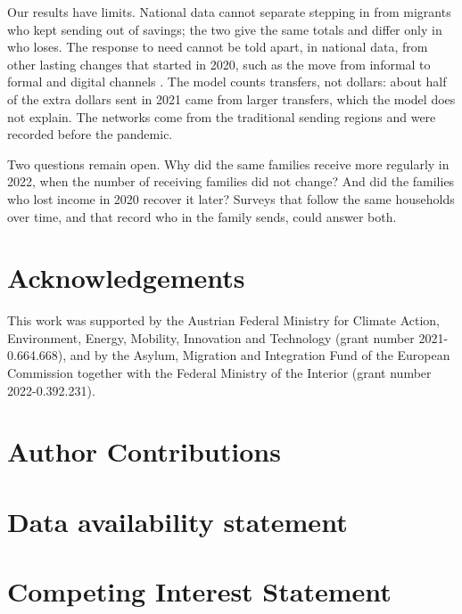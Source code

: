 \documentclass[11pt]{article}
\begin{document}
Our results have limits. National data cannot separate stepping in from migrants who kept sending out of savings; the two give the same totals and differ only in who loses. The response to need cannot be told apart, in national data, from other lasting changes that started in 2020, such as the move from informal to formal and digital channels \cite{dinarte2022neither, Bersch2021, amuedo2005use}. The model counts transfers, not dollars: about half of the extra dollars sent in 2021 came from larger transfers, which the model does not explain. The networks come from the traditional sending regions and were recorded before the pandemic.

Two questions remain open. Why did the same families receive more regularly in 2022, when the number of receiving families did not change? And did the families who lost income in 2020 recover it later? Surveys that follow the same households over time, and that record who in the family sends, could answer both.

\newpage
\printbibliography


\section*{Acknowledgements}

This work was supported by the Austrian Federal Ministry for Climate Action, Environment, Energy, Mobility, Innovation and Technology (grant number 2021-0.664.668), and by the Asylum, Migration and Integration Fund of the European Commission together with the Federal Ministry of the Interior (grant number 2022-0.392.231).

\section*{Author Contributions}


\section*{Data availability statement}


\section*{Competing Interest Statement}


\end{document}
